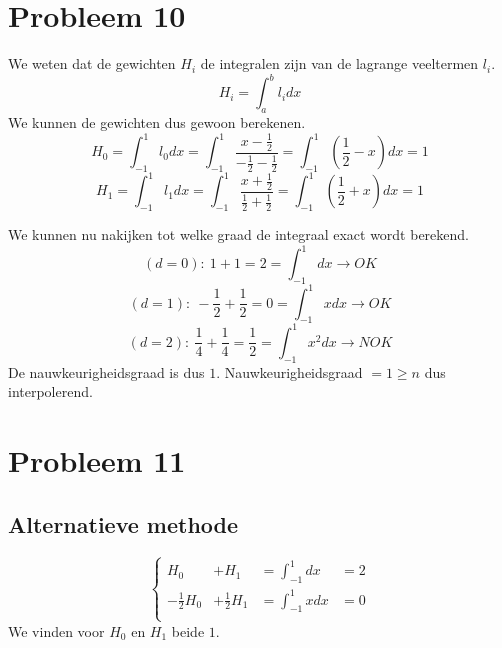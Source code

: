 \documentclass[12pt,a4paper]{article}
\begin{document}
\section{Probleem 10}
We weten dat de gewichten $H_i$ de integralen zijn van de lagrange veeltermen $l_i$.
\[
H_i = \int_{a}^{b}l_idx
\]
We kunnen de gewichten dus gewoon berekenen.
\[
H_0 = \int_{-1}^{1}l_{0}dx = \int_{-1}^{1}\frac{x - \frac{1}{2}}{-\frac{1}{2}-\frac{1}{2}} = \int_{-1}^{1}\left(\frac{1}{2}-x\right)dx = 1
\]
\[
H_1 = \int_{-1}^{1}l_{1}dx = \int_{-1}^{1}\frac{x + \frac{1}{2}}{\frac{1}{2}+\frac{1}{2}} = \int_{-1}^{1}\left(\frac{1}{2}+x\right)dx = 1
\]

We kunnen nu nakijken tot welke graad de integraal exact wordt berekend.
\[
(d=0):\ 1+1=2=\int_{-1}^{1}dx \rightarrow OK
\]
\[
(d=1):\ -\frac{1}{2}+\frac{1}{2}=0=\int_{-1}^{1}xdx \rightarrow OK
\]
\[
(d=2):\ \frac{1}{4}+\frac{1}{4}=\frac{1}{2}=\int_{-1}^{1}x^2dx \rightarrow NOK
\]
De nauwkeurigheidsgraad is dus $1$.
Nauwkeurigheidsgraad $ = 1 \ge n$ dus interpolerend.

\section{Probleem 11}

\subsection*{Alternatieve methode}
\[
\left\{
\begin{array}{cccc}
H_0 &+ H_1 &= \int_{-1}^{1}dx &= 2\\
-\frac{1}{2}H_0 &+ \frac{1}{2}H_1 &= \int_{-1}^{1}xdx &= 0\\
\end{array}
\right.
\]
We vinden voor $H_0$ en $H_1$ beide $1$.
\end{document}
